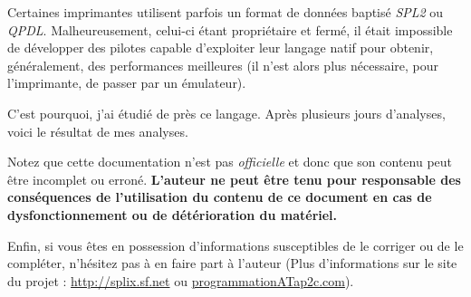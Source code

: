 Certaines imprimantes utilisent parfois un format de données baptisé 
\emph{SPL2} ou \emph{QPDL}. Malheureusement, celui-ci étant propriétaire et 
fermé, il était impossible de développer des pilotes capable d'exploiter
leur langage natif pour obtenir, généralement, des performances meilleures
(il n'est alors plus nécessaire, pour l'imprimante, de passer par un 
émulateur). 

C'est pourquoi, j'ai étudié de près ce langage. Après plusieurs jours 
d'analyses, voici le résultat de mes analyses.
\medskip

Notez que cette documentation n'est pas \emph{officielle} et donc que 
son contenu peut être incomplet ou erroné. \textbf{L'auteur ne peut être 
tenu pour responsable des conséquences de l'utilisation du contenu de ce 
document en cas de dysfonctionnement ou de détérioration du matériel.}
\medskip

Enfin, si vous êtes en possession d'informations susceptibles de le corriger
ou de le compléter, n'hésitez pas à en faire part à l'auteur (Plus
d'informations sur le site du projet : \url{http://splix.sf.net} ou
\url{programmationATap2c.com}).
